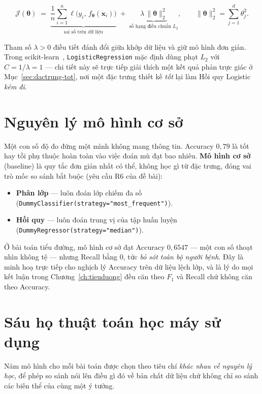 \begin{equation}
\mathcal{J}(\bm\theta)
\;=\; \underbrace{\frac{1}{n}\sum_{i=1}^{n} \ell\big(y_i,\, f_{\bm\theta}(\mathbf{x}_i)\big)}_{\text{sai số trên dữ liệu}}
\;+\; \underbrace{\lambda \,\lVert \bm\theta \rVert_{2}^{2}}_{\text{số hạng điều chuẩn } L_2},
\qquad
\lVert \bm\theta \rVert_{2}^{2}=\sum_{j=1}^{d}\theta_j^{2}.
\label{eq:regularized}
\end{equation}

\noindent Tham số $\lambda>0$ điều tiết đánh đổi giữa khớp dữ liệu và giữ mô
hình đơn giản. Trong scikit-learn~\cite{scikit2011}, \texttt{LogisticRegression} mặc định dùng
phạt $L_2$ với $C=1/\lambda=1$ --- chi tiết này sẽ trực tiếp giải thích một kết
quả phản trực giác ở Mục~\ref{sec:dactrung-tot}, nơi một đặc trưng thiết kế
\emph{tốt} lại làm Hồi quy Logistic \emph{kém đi}.

\section{Nguyên lý mô hình cơ sở}
\label{sec:baseline}

Một con số độ đo đứng một mình không mang thông tin. Accuracy $0{,}79$ là tốt
hay tồi phụ thuộc hoàn toàn vào việc đoán mù đạt bao nhiêu. \textbf{Mô hình cơ
sở} (baseline) là quy tắc đơn giản nhất có thể, không học gì từ đặc trưng, đóng
vai trò mốc so sánh bắt buộc (yêu cầu R6 của đề bài):

\begin{itemize}
  \item \textbf{Phân lớp} --- luôn đoán lớp chiếm đa số
        (\texttt{DummyClassifier(strategy="most\_frequent")}).
  \item \textbf{Hồi quy} --- luôn đoán trung vị của tập huấn luyện
        (\texttt{DummyRegressor(strategy="median")}).
\end{itemize}

Ở bài toán tiểu đường, mô hình cơ sở đạt Accuracy $0{,}6547$ --- một con số
thoạt nhìn không tệ --- nhưng Recall bằng $0$, tức \emph{bỏ sót toàn bộ người
bệnh}. Đây là minh hoạ trực tiếp cho nghịch lý Accuracy trên dữ liệu lệch lớp,
và là lý do mọi kết luận trong Chương~\ref{ch:tieuduong} đều căn theo $F_1$ và
Recall chứ không căn theo Accuracy.

\section{Sáu họ thuật toán học máy sử dụng}

Năm mô hình cho mỗi bài toán được chọn theo tiêu chí \emph{khác nhau về nguyên
lý học}, để phép so sánh nói lên điều gì đó về bản chất dữ liệu chứ không chỉ
so sánh các biến thể của cùng một ý tưởng.

